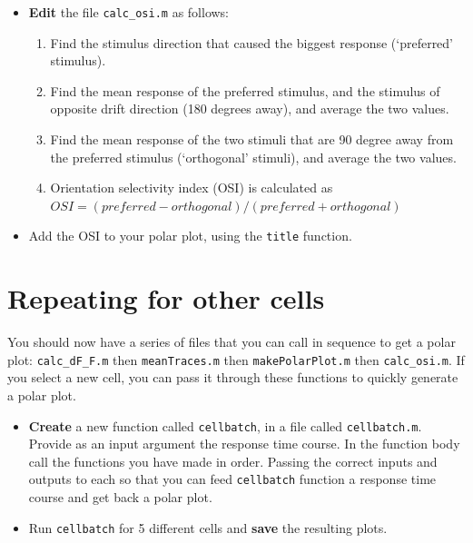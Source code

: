 \documentclass[paper=a4, fontsize=11pt]{article} %
\numberwithin{equation}{section} %
\numberwithin{figure}{section} %
\numberwithin{table}{section} %
\begin{document}
\begin{itemize}
\item \textbf{Edit} the file \texttt{calc\_osi.m} as follows:
  \begin{enumerate}
  \item Find the stimulus direction that caused the biggest response (`preferred' stimulus).
  \item Find the mean response of the preferred stimulus, and the stimulus of opposite drift direction (180 degrees away), and average the two values.
  \item Find the mean response of the two stimuli that are 90 degree away from the preferred stimulus (`orthogonal' stimuli), and average the two values.
  \item Orientation selectivity index (OSI) is calculated as \\ $OSI = {\left(preferred - orthogonal\right)} / {\left(preferred + orthogonal\right)}$
  \end{enumerate}
\item Add the OSI to your polar plot, using the \texttt{title} function.
\end{itemize}



\section{Repeating for other cells}

You should now have a series of files that you can call in sequence to get a polar plot: \texttt{calc\_dF\_F.m} then \texttt{meanTraces.m} then \texttt{makePolarPlot.m} then \texttt{calc\_osi.m}. If you select a new cell, you can pass it through these functions to quickly generate a polar plot. 

\begin{itemize}
\item \textbf{Create} a new function called \texttt{cellbatch}, in a file called \texttt{cellbatch.m}. Provide as an input argument the response time course. In the function body call the functions you have made in order. Passing the correct inputs and outputs to each so that you can feed \texttt{cellbatch} function a response time course and get back a polar plot.
\item Run \texttt{cellbatch} for 5 different cells and \textbf{save} the resulting plots.
\end{itemize}
\end{document}
